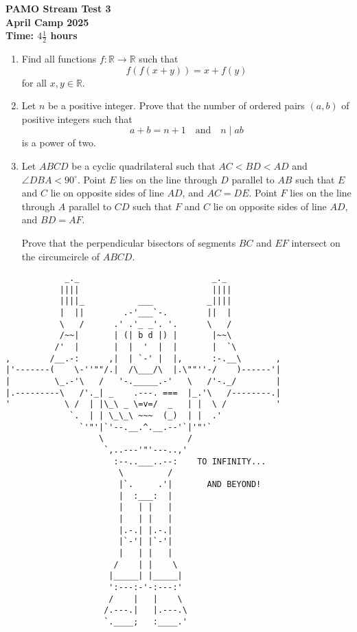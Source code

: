 \documentclass[12pt]{article}
\begin{document}
\thispagestyle{empty}

\begin{center}
  \bfseries
  \Large PAMO Stream Test 3
  \\ \bigskip
  \large April Camp 2025
  \\ \bigskip
  \large Time: $4\frac{1}{2}$ hours
\end{center}

\begin{enumerate}[leftmargin=0pt,topsep=2\bigskipamount,itemsep=\bigskipamount]

\item  Find all functions $f : \mathbb{R} \to \mathbb{R}$ such that
$$ f(f(x+y)) = x + f(y) $$
for all $x, y \in \mathbb{R}$.

\item Let $n$ be a positive integer. Prove that the number of ordered pairs $(a, b)$ of positive integers such that
\[
a+b=n+1\quad\text{and}\quad n\mid ab
\]
is a power of two.

\item Let $ABCD$ be a cyclic quadrilateral such that $AC < BD < AD$ and $\angle DBA < 90^{\circ}$.
Point $E$ lies on the line through $D$ parallel to $AB$ such that $E$ and $C$ lie on opposite sides of line $AD$, and $AC = DE$.
Point $F$ lies on the line through $A$ parallel to $CD$ such that $F$ and $C$ lie on opposite sides of line $AD$, and $BD = AF$.

Prove that the perpendicular bisectors of segments $BC$ and $EF$ intersect on the circumcircle of $ABCD$.

\end{enumerate}


\vfill
\centering
\tiny %
\begin{BVerbatim}
            _._                           _._
           ||||                           ||||
           ||||_           ___           _||||
           |  ||        .-'___`-.        ||  |
           \   /      .' .'_ _'. '.      \   /
           /~~|       | (| b d |) |       |~~\
          /'  |       |  |  '  |  |       |  `\
,        /__.-:      ,|  | `-' |  |,      :-.__\       ,
|'-------(    \-''""/.|  /\___/\  |.\""''-/    )------'|
|         \_.-'\   /   '-._____.-'   \   /'-._/        |
|.---------\   /'._| _    .---. ===  |_.'\   /--------.|
'           \ /  | |\_\ _ \=v=/  _   | |  \ /          '
             `.  | | \_\_\ ~~~  (_)  | |  .'
               `'"'|`'--.__.^.__.--'`|'"'`
                   \                 /
                    `,..---'"'---..,'
                      :--..___..--:    TO INFINITY...
                       \         /  
                       |`.     .'|       AND BEYOND!
                       |  :___:  |
                       |   | |   |
                       |   | |   |
                       |.-.| |.-.|
                       |`-'| |`-'|
                       |   | |   |
                      /    | |    \
                     |_____| |_____|
                     ':---:-'-:---:'
                     /    |   |    \
                    /.---.|   |.---.\
                    `.____;   :____.'
\end{BVerbatim}
\end{document}
